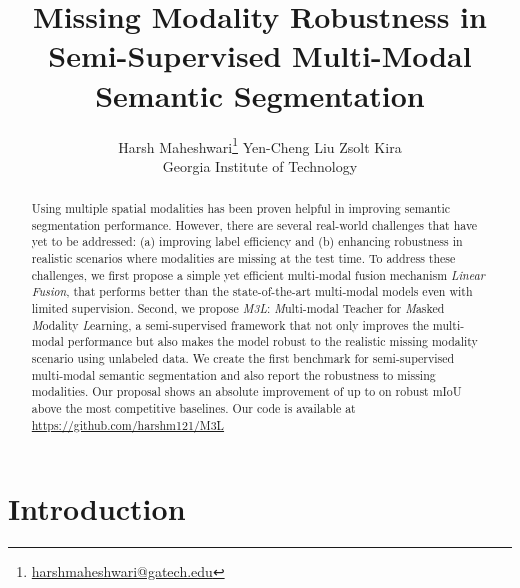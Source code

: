 \documentclass[10pt,twocolumn,letterpaper]{article}
\begin{document}
\title{Missing Modality Robustness in Semi-Supervised Multi-Modal \\Semantic Segmentation}

\author{Harsh Maheshwari\thanks{\href{mailto:harshmaheshwari@gatech.edu}{harshmaheshwari@gatech.edu}}
\qquad
Yen-Cheng Liu
\qquad
Zsolt Kira\\
Georgia Institute of Technology\\
}

\maketitle
\ifxfinal\thispagestyle{empty}\fi


\begin{abstract}
   Using multiple spatial modalities has been proven helpful in improving semantic segmentation performance.
    However, there are several real-world challenges that have yet to be addressed: (a) improving label efficiency and (b) enhancing robustness in realistic scenarios where modalities are missing at the test time. To address these challenges, we first propose a simple yet efficient multi-modal fusion mechanism \emph{Linear Fusion}, that performs better than the state-of-the-art multi-modal models even with limited supervision. Second, we propose \emph{M3L}: \emph{M}ulti-modal Teacher for \emph{M}asked \emph{M}odality \emph{L}earning, a semi-supervised framework that not only improves the multi-modal performance but also makes the model robust to the realistic missing modality scenario using unlabeled data. We create the first benchmark for semi-supervised multi-modal semantic segmentation and also report the robustness to missing modalities. Our proposal shows an absolute improvement of up to  on robust mIoU above the most competitive baselines. Our code is available at \href{https://github.com/harshm121/M3L}{https://github.com/harshm121/M3L}
\end{abstract}

\section{Introduction}
\end{document}
